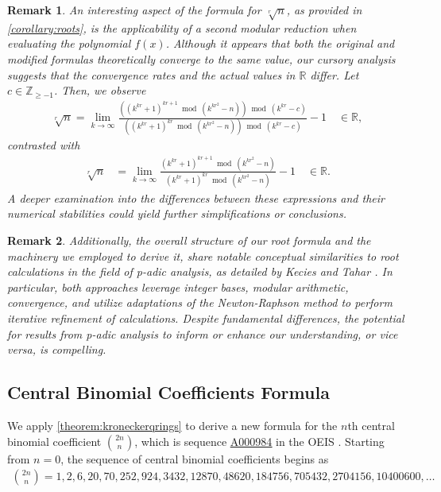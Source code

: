 \documentclass[11pt,reqno]{article}
\theoremstyle{plain}
\newtheorem{remark}{Remark}
\theoremstyle{definition}
\newcommand{\seqnum}[1]{\href{https://oeis.org/#1}{\rm \underline{#1}}}
\begin{document}
\begin{remark}
An interesting aspect of the formula for $\sqrt[r]{n}$, as provided in \cref{corollary:roots}, is the applicability of a second modular reduction when evaluating the polynomial $f(x)$. Although it appears that both the original and modified formulas theoretically converge to the same value, our cursory analysis suggests that the convergence rates and the actual values in $\mathbb{R}$ differ. Let $c \in \mathbb{Z}_{\geq -1}$. Then, we observe
\begin{align*}
\sqrt[r]{n} = \lim_{k \rightarrow \infty}
\frac{\left( (k^{kr} + 1)^{kr+1} \bmod{(k^{kr^2}-n)} \right) \bmod{(k^{kr}-c)}}
    {\left( (k^{kr} + 1)^{kr} \bmod{ (k^{kr^2}-n)} \right) \bmod{(k^{kr}-c)}} - 1  \quad \in \mathbb{R},
\end{align*}
contrasted with
\begin{align*}
\sqrt[r]{n} &= \lim_{k \rightarrow \infty}
    \frac{(k^{kr} + 1)^{kr+1} \bmod{(k^{kr^2}-n)}}
    {(k^{kr} + 1)^{kr} \bmod{ (k^{kr^2}-n)}} - 1  \quad \in \mathbb{R}.
\end{align*}
A deeper examination into the differences between these expressions and their numerical stabilities could yield further simplifications or conclusions.
\end{remark}

\begin{remark}
Additionally, the overall structure of our root formula and the machinery we employed to derive it, share notable conceptual similarities to root calculations in the field of p-adic analysis, as detailed by Kecies and Tahar \cite{kecies2013padic}. In particular, both approaches leverage integer bases, modular arithmetic, convergence, and utilize adaptations of the Newton-Raphson method to perform iterative refinement of calculations. Despite fundamental differences, the potential for results from p-adic analysis to inform or enhance our understanding, or vice versa, is compelling.
\end{remark}

\subsection{Central Binomial Coefficients Formula}
We apply \cref{theorem:kroneckerqrings} to derive a new formula for the $n$th central binomial coefficient $\binom{2n}{n}$, which is sequence \seqnum{A000984} in the OEIS \cite{A000984}. Starting from $n=0$, the sequence of central binomial coefficients begins as
\begin{align*}
    \binom{2n}{n} = 1, 2, 6, 20, 70, 252, 924, 3432, 12870, 48620, 184756, 705432, 2704156, 10400600, \ldots
\end{align*}
\end{document}
